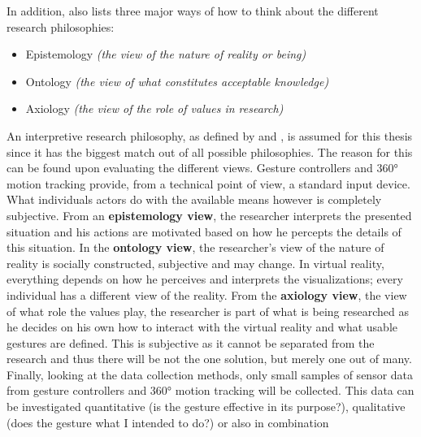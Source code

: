 In addition, \cite{Saunders2009} also lists three major ways of how to think about the different research philosophies:
\begin{itemize}[noitemsep,nolistsep]
	\item Epistemology \textit{(the view of the nature of reality or being)}
	\item Ontology \textit{(the view of what constitutes acceptable knowledge)}
	\item Axiology \textit{(the view of the role of values in research)}
\end{itemize}

An interpretive research philosophy, as defined by \cite{Vaishnavi2008} and \cite{Saunders2009}, is assumed for this thesis since it has the biggest match out of all possible philosophies. The reason for this can be found upon evaluating the different views. \newline
Gesture controllers and 360° motion tracking provide, from a technical point of view, a standard input device. What individuals actors do with the available means however is completely subjective. From an \textbf{epistemology view}, the researcher interprets the presented situation and his actions are motivated based on how he percepts the details of this situation. \newline
In the \textbf{ontology view}, the researcher's view of the nature of reality is socially constructed, subjective and may change. In virtual reality, everything depends on how he perceives and interprets the visualizations; every individual has a different view of the reality. \newline
From the \textbf{axiology view}, the view of what role the values play, the researcher is part of what is being researched as he decides on his own how to interact with the virtual reality and what usable gestures are defined. This is subjective as it cannot be separated from the research and thus there will be not the one solution, but merely one out of many. \newline
Finally, looking at the data collection methods, only small samples of sensor data from gesture controllers and 360° motion tracking will be collected. This data can be investigated quantitative (is the gesture effective in its purpose?), qualitative (does the gesture what I intended to do?) or also in combination



